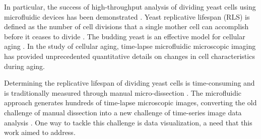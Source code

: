 \documentclass[conference]{IEEEtran}
\begin{document}
In particular, the success of high-throughput analysis of dividing yeast cells using microfluidic devices has been demonstrated \cite{r13}. Yeast replicative lifespan (RLS) is defined as the number of cell divisions that a single mother cell can accomplish before it ceases to divide \cite{r14}. The budding yeast is an effective model for cellular aging \cite{r15}.
In the study of cellular aging, time-lapse microfluidic microscopic imaging has provided unprecedented quantitative details on changes in cell characteristics during aging. 
%
%
%

%
 Determining the replicative lifespan of dividing yeast cells is time-consuming and is traditionally measured through manual micro-dissection \cite{r16,r17}. The microfluidic approach
 generates hundreds of time-lapse microscopic images, converting the old challenge of manual dissection into a new challenge of time-series image data analysis \cite{r18,r19,r20}. One way to tackle this challenge is data visualization, a need that this work aimed to address. 

\end{document}
